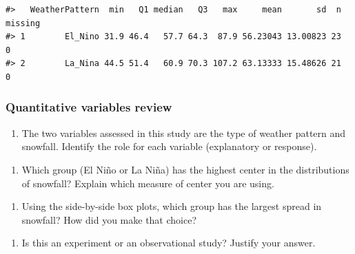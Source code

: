 \documentclass[
]{report}
\providecommand{\tightlist}{%
  \setlength{\itemsep}{0pt}\setlength{\parskip}{0pt}}
\newcommand\latexcode[1]{#1}
\begin{document}
\begin{verbatim}
#>   WeatherPattern  min   Q1 median   Q3   max     mean       sd  n missing
#> 1        El_Nino 31.9 46.4   57.7 64.3  87.9 56.23043 13.00823 23       0
#> 2        La_Nina 44.5 51.4   60.9 70.3 107.2 63.13333 15.48626 21       0
\end{verbatim}

\hypertarget{quantitative-variables-review}{%
\subsubsection*{Quantitative variables review}\label{quantitative-variables-review}}

\begin{enumerate}
\def\labelenumi{\arabic{enumi}.}
\tightlist
\item
  The two variables assessed in this study are the type of weather pattern and snowfall. Identify the role for each variable (explanatory or response).
\end{enumerate}

\vspace{.6in}

\begin{enumerate}
\def\labelenumi{\arabic{enumi}.}
\setcounter{enumi}{1}
\tightlist
\item
  Which group (El Ni\latexcode{\~{n}}o or La Ni\latexcode{\~{n}}a) has the highest center in the distributions of snowfall? Explain which measure of center you are using.
\end{enumerate}

\vspace{.6in}

\begin{enumerate}
\def\labelenumi{\arabic{enumi}.}
\setcounter{enumi}{2}
\tightlist
\item
  Using the side-by-side box plots, which group has the largest spread in snowfall? How did you make that choice?
\end{enumerate}

\vspace{.6in}

\newpage

\begin{enumerate}
\def\labelenumi{\arabic{enumi}.}
\setcounter{enumi}{3}
\tightlist
\item
  Is this an experiment or an observational study? Justify your answer.
\end{enumerate}
\end{document}
